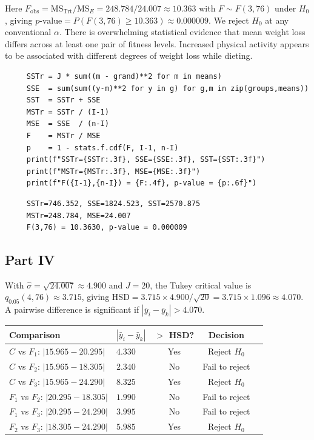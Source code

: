 \documentclass[letterpaper]{article}
\begin{document}
		Here $F_{\mathrm{obs}} = \mathrm{MS}_{\mathrm{Trt}} / \mathrm{MS}_E = 248.784 / 24.007 \approx 10.363$
		with $F \sim F(3, 76)$ under $H_0$, giving $p\text{-value} = P(F(3,76) \geq 10.363) \approx 0.000009$.
		We reject $H_0$ at any conventional $\alpha$. There is overwhelming statistical evidence that mean weight
		loss differs across at least one pair of fitness levels. Increased physical activity appears to be
		associated with different degrees of weight loss while dieting.
		
		\begin{lstlisting}
     SSTr = J * sum((m - grand)**2 for m in means)
     SSE  = sum(sum((y-m)**2 for y in g) for g,m in zip(groups,means))
     SST  = SSTr + SSE
     MSTr = SSTr / (I-1)
     MSE  = SSE  / (n-I)
     F    = MSTr / MSE
     p    = 1 - stats.f.cdf(F, I-1, n-I)
     print(f"SSTr={SSTr:.3f}, SSE={SSE:.3f}, SST={SST:.3f}")
     print(f"MSTr={MSTr:.3f}, MSE={MSE:.3f}")
     print(f"F({I-1},{n-I}) = {F:.4f}, p-value = {p:.6f}")
		\end{lstlisting}
		\begin{minipage}{\linewidth}
			\begin{Verbatim}
     SSTr=746.352, SSE=1824.523, SST=2570.875
     MSTr=248.784, MSE=24.007
     F(3,76) = 10.3630, p-value = 0.000009
			\end{Verbatim}
		\end{minipage}
		\clearpage
		\subsection{Part IV}
		With $\hat{\sigma} = \sqrt{24.007} \approx 4.900$ and $J = 20$,
		the Tukey critical value is $q_{0.05}(4, 76) \approx 3.715$, giving
		$\mathrm{HSD} = 3.715 \times 4.900/\sqrt{20} = 3.715 \times 1.096 \approx 4.070$.
		A pairwise difference is significant if $|\bar{y}_i - \bar{y}_k| > 4.070$.
		
		\begin{center}
			\begin{tabular}{llccc}
				\hline
				Comparison & $|\bar{y}_i - \bar{y}_k|$ & $>$ HSD? & Decision \\
				\hline
				$C$ vs $F_1$: $|15.965 - 20.295|$ & $4.330$ & Yes & Reject $H_0$ \\
				$C$ vs $F_2$: $|15.965 - 18.305|$ & $2.340$ & No  & Fail to reject \\
				$C$ vs $F_3$: $|15.965 - 24.290|$ & $8.325$ & Yes & Reject $H_0$ \\
				$F_1$ vs $F_2$: $|20.295 - 18.305|$ & $1.990$ & No  & Fail to reject \\
				$F_1$ vs $F_3$: $|20.295 - 24.290|$ & $3.995$ & No  & Fail to reject \\
				$F_2$ vs $F_3$: $|18.305 - 24.290|$ & $5.985$ & Yes & Reject $H_0$ \\
				\hline
			\end{tabular}
		\end{center}
		
\end{document}
